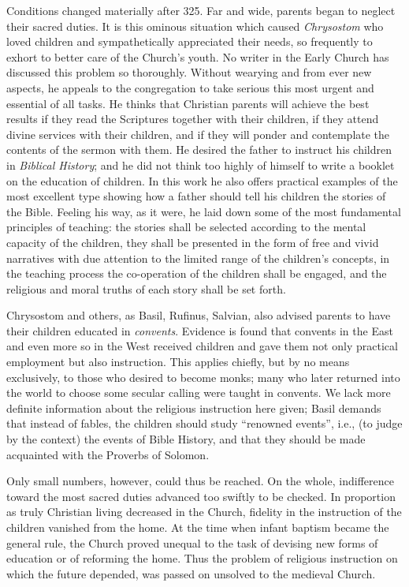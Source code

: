 Conditions changed materially after 325. Far and wide, parents began to neglect their sacred duties. It is this ominous situation which caused \emph{Chrysostom} who loved children and sympathetically appreciated their needs, so frequently to exhort to better care of the Church’s youth. No writer in the Early Church has discussed this problem so thoroughly. Without wearying and from ever new aspects, he appeals to the congregation to take serious this most urgent and essential of all tasks. He thinks that Christian parents will achieve the best results if they read the Scriptures together with their children, if they attend divine services with their children, and if they will ponder and contemplate the contents of the sermon with them. He desired the father to instruct his children in \emph{Biblical History}; and he did not think too highly of himself to write a booklet on the education of children. In this work he also offers practical examples of the most excellent type showing how a father should tell his children the stories of the Bible. Feeling his way, as it were, he laid down some of the most fundamental principles of teaching: the stories shall be selected according to the mental capacity of the children, they shall be presented
in the form of free and vivid narratives with due attention to the limited range of the children’s concepts, in the teaching process the co-operation of the children shall be engaged, and the religious and moral truths of each story shall be set forth.

Chrysostom and others, as Basil, Rufinus, Salvian, also advised parents to have their children educated in \emph{convents}. Evidence is found that convents in the East and even more so in the West received children and gave them not only practical employment but also instruction. This applies chiefly, but by no means exclusively, to those who desired to become monks; many who later returned into the world to choose some secular calling were taught in convents. We lack more definite information about the religious instruction here given; Basil demands that instead of fables, the children should study “renowned events”, i.e., (to judge by the context) the events of Bible History, and that they should be made acquainted with the Proverbs of Solomon.

Only small numbers, however, could thus be reached. On the whole, indifference toward the most sacred duties advanced too swiftly to be checked. In proportion as truly Christian living decreased in the Church, fidelity in the instruction of the children vanished from the home. At the time when infant baptism became the general rule, the Church proved unequal to the task of devising new forms of education or of reforming the home. Thus the problem of religious instruction on which the future depended, was passed on unsolved to the medieval Church.
